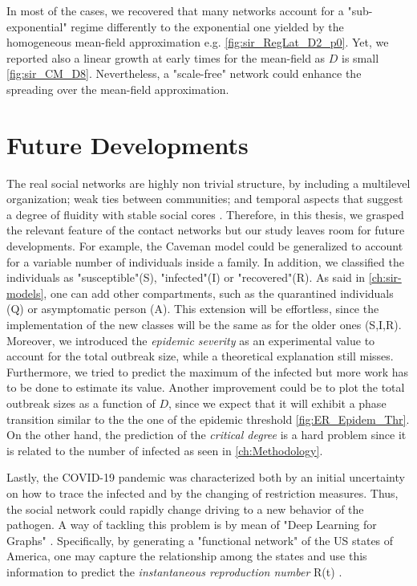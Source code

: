 \documentclass[a4paper,10pt,twoside]{book} %
\theoremstyle{definition}
\begin{document}
In most of the cases, we recovered that many networks account for a "sub-exponential" regime differently to the exponential one yielded by the homogeneous mean-field approximation e.g. \autoref{fig:sir_RegLat_D2_p0}. Yet, we reported also a linear growth at early times for the mean-field as $ D$ is small \autoref{fig:sir_CM_D8}. Nevertheless, a "scale-free" network could enhance the spreading over the mean-field approximation.

\section{Future Developments}
The real social networks are highly non trivial structure, by including a multilevel organization; weak ties between communities; and temporal aspects that suggest a degree of fluidity with stable social cores \cite{Thurner::NetBasedExpl}. Therefore, in this thesis, we grasped the relevant feature of the contact networks but our study leaves room for future developments. For example, the Caveman model could be generalized to account for a variable number of individuals inside a family. 
In addition, we classified the individuals as "susceptible"(S), "infected"(I) or "recovered"(R). As said in \autoref{ch:sir-models}, one can add other compartments, such as the quarantined individuals (Q) or asymptomatic person (A). This extension will be effortless, since the implementation of the new classes will be the same as for the older ones (S,I,R).
Moreover, we introduced the \textit{epidemic severity} as an experimental value to account for the total outbreak size, while a theoretical explanation still misses. Furthermore, we tried to predict the maximum of the infected but more work has to be done to estimate its value. Another improvement could be to plot the total outbreak sizes as a function of $ D$, since we expect that it will exhibit a phase transition similar to the the one of the epidemic threshold \autoref{fig:ER_Epidem_Thr}. On the other hand, the prediction of the \textit{critical degree} is a hard problem since it is related to the number of infected as seen in \autoref{ch:Methodology}. 

Lastly, the COVID-19 pandemic was characterized both by an initial uncertainty on how to trace the infected and by the changing of restriction measures. Thus, the social network could rapidly change driving to a new behavior of the pathogen. A way of tackling this problem is by mean of "Deep Learning for Graphs" \cite{Bacciu_Micheli:2020_IntroDGNPisa}. Specifically, by generating a "functional network" of the US states of America, one may capture the relationship among the states and use this information to predict the \textit{instantaneous reproduction number} R(t) \cite{Davahli::USA_predicting_COVID19}.
\end{document}
